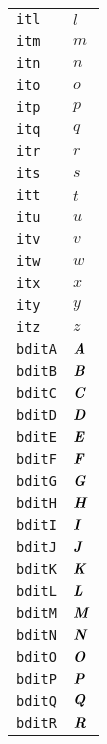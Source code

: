 \begin{longtable}{ll}
\texttt{itl}&${}{\textit{l}}{}$\\
\texttt{itm}&${}{\textit{m}}{}$\\
\texttt{itn}&${}{\textit{n}}{}$\\
\texttt{ito}&${}{\textit{o}}{}$\\
\texttt{itp}&${}{\textit{p}}{}$\\
\texttt{itq}&${}{\textit{q}}{}$\\
\texttt{itr}&${}{\textit{r}}{}$\\
\texttt{its}&${}{\textit{s}}{}$\\
\texttt{itt}&${}{\textit{t}}{}$\\
\texttt{itu}&${}{\textit{u}}{}$\\
\texttt{itv}&${}{\textit{v}}{}$\\
\texttt{itw}&${}{\textit{w}}{}$\\
\texttt{itx}&${}{\textit{x}}{}$\\
\texttt{ity}&${}{\textit{y}}{}$\\
\texttt{itz}&${}{\textit{z}}{}$\\
\texttt{bditA}&${}{\textbf{\textit{A}}}{}$\\
\texttt{bditB}&${}{\textbf{\textit{B}}}{}$\\
\texttt{bditC}&${}{\textbf{\textit{C}}}{}$\\
\texttt{bditD}&${}{\textbf{\textit{D}}}{}$\\
\texttt{bditE}&${}{\textbf{\textit{E}}}{}$\\
\texttt{bditF}&${}{\textbf{\textit{F}}}{}$\\
\texttt{bditG}&${}{\textbf{\textit{G}}}{}$\\
\texttt{bditH}&${}{\textbf{\textit{H}}}{}$\\
\texttt{bditI}&${}{\textbf{\textit{I}}}{}$\\
\texttt{bditJ}&${}{\textbf{\textit{J}}}{}$\\
\texttt{bditK}&${}{\textbf{\textit{K}}}{}$\\
\texttt{bditL}&${}{\textbf{\textit{L}}}{}$\\
\texttt{bditM}&${}{\textbf{\textit{M}}}{}$\\
\texttt{bditN}&${}{\textbf{\textit{N}}}{}$\\
\texttt{bditO}&${}{\textbf{\textit{O}}}{}$\\
\texttt{bditP}&${}{\textbf{\textit{P}}}{}$\\
\texttt{bditQ}&${}{\textbf{\textit{Q}}}{}$\\
\texttt{bditR}&${}{\textbf{\textit{R}}}{}$\\

\end{longtable}
